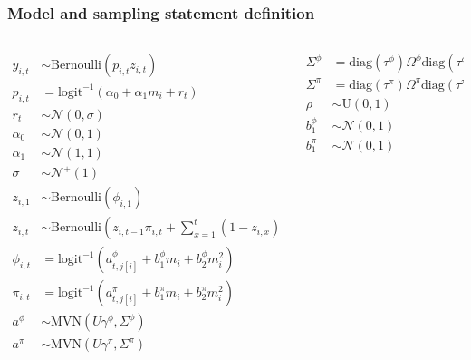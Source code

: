 \documentclass{beamer}
\begin{document}
\begin{frame}
  \frametitle{Model and sampling statement definition}
  \begin{center}
    \begin{scriptsize}
      \begin{columns}
        \begin{column}{0.5\textwidth}
          \begin{align*}
            y_{i, t} &\sim \text{Bernoulli}(p_{i, t} z_{i, t}) \\
            p_{i, t} &= \text{logit}^{-1}(\alpha_{0} + \alpha_{1} m_{i} + r_{t}) \\ 
            r_{t} &\sim \mathcal{N}(0, \sigma) \\
            \alpha_{0} &\sim \mathcal{N}(0, 1) \\
            \alpha_{1} &\sim \mathcal{N}(1, 1) \\
            \sigma &\sim \mathcal{N}^{+}(1) \\
            z_{i, 1} &\sim \text{Bernoulli}(\phi_{i, 1}) \\
            z_{i, t} &\sim \text{Bernoulli}\left(z_{i, t - 1} \pi_{i,t} + \sum_{x = 1}^{t}(1 - z_{i, x}) \phi_{i,t}\right) \\
            \phi_{i, t} &= \text{logit}^{-1}(a^{\phi}_{t, j[i]} + b^{\phi}_{1} m_{i} + b^{\phi}_{2} m_{i}^{2}) \\
            \pi_{i, t} &= \text{logit}^{-1}(a^{\pi}_{t, j[i]} + b^{\pi}_{1} m_{i} + b^{\pi}_{2} m_{i}^{2}) \\
            a^{\phi} &\sim \text{MVN}(U \gamma^{\phi}, \Sigma^{\phi}) \\
            a^{\pi} &\sim \text{MVN}(U \gamma^{\pi}, \Sigma^{\pi}) \\
          \end{align*}
        \end{column}
        \begin{column}{0.5\textwidth}
          \begin{align*}
            \Sigma^{\phi} &= \text{diag}(\tau^{\phi}) \Omega^{\phi} \text{diag}(\tau^{\phi}) \\
            \Sigma^{\pi} &= \text{diag}(\tau^{\pi}) \Omega^{\pi} \text{diag}(\tau^{\pi}) \\
            \rho &\sim \text{U}(0, 1) \\
            b^{\phi}_{1} &\sim \mathcal{N}(0, 1) \\
            b^{\pi}_{1} &\sim \mathcal{N}(0, 1) \\

\end{align*}
\end{column}
\end{columns}
\end{scriptsize}
\end{center}
\end{frame}
\end{document}
